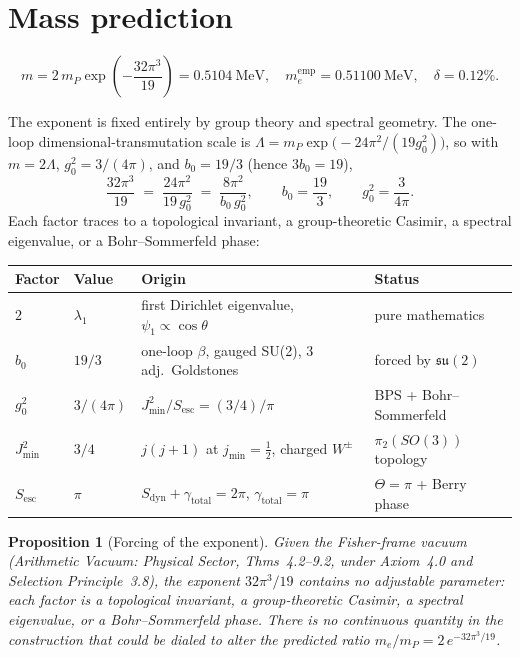 \documentclass[12pt]{article}
\newtheorem{proposition}[theorem]{Proposition}
\theoremstyle{definition}
\theoremstyle{remark}
\begin{document}
\section{Mass prediction}
\label{sec:mass}

\begin{equation}
\boxed{m=2\,m_P\exp\!\left(-\frac{32\pi^3}{19}\right)
=0.5104\ \mathrm{MeV},\quad m_e^{\mathrm{emp}}=0.51100\ \mathrm{MeV},
\quad \delta=0.12\%.}
\label{eq:massfinal}
\end{equation}

\medskip
The exponent is fixed entirely by group theory and spectral geometry. The
one-loop dimensional-transmutation scale is
$\Lambda=m_P\exp\!\bigl(-24\pi^2/(19g_0^2)\bigr)$, so with $m=2\Lambda$,
$g_0^2=3/(4\pi)$, and $b_0=19/3$ (hence $3b_0=19$),
\begin{equation}
\frac{32\pi^3}{19}\;=\;\frac{24\pi^2}{19\,g_0^2}\;=\;\frac{8\pi^2}{b_0\,g_0^2},
\qquad b_0=\frac{19}{3},\qquad g_0^2=\frac{3}{4\pi}.
\label{eq:expforced}
\end{equation}
Each factor traces to a topological invariant, a group-theoretic Casimir, a
spectral eigenvalue, or a Bohr--Sommerfeld phase:

\medskip
\begin{center}
{\small
\begin{tabular}{llll}\toprule
Factor & Value & Origin & Status\\\midrule
$2$ & $\lambda_1$ & first Dirichlet eigenvalue, $\psi_1\propto\cos\theta$ & pure mathematics\\
$b_0$ & $19/3$ & one-loop $\beta$, gauged SU(2), 3 adj.\ Goldstones & forced by $\mathfrak{su}(2)$\\
$g_0^2$ & $3/(4\pi)$ & $J_{\min}^2/S_{\mathrm{esc}}=(3/4)/\pi$ & BPS + Bohr--Sommerfeld\\
$J_{\min}^2$ & $3/4$ & $j(j{+}1)$ at $j_{\min}=\tfrac12$, charged $W^\pm$ & $\pi_2(SO(3))$ topology\\
$S_{\mathrm{esc}}$ & $\pi$ & $S_{\mathrm{dyn}}+\gamma_{\mathrm{total}}=2\pi$, $\gamma_{\mathrm{total}}=\pi$ & $\Theta=\pi$ + Berry phase\\\bottomrule
\end{tabular}}
\end{center}

\begin{proposition}[Forcing of the exponent]
\label{prop:expforced}
Given the Fisher-frame vacuum (\emph{Arithmetic Vacuum: Physical Sector},
Thms~4.2--9.2, under Axiom~4.0 and Selection Principle~3.8), the exponent
$32\pi^3/19$ contains no adjustable parameter: each factor is a topological
invariant, a group-theoretic Casimir, a spectral eigenvalue, or a
Bohr--Sommerfeld phase. There is no continuous quantity in the construction
that could be dialed to alter the predicted ratio $m_e/m_P=2\,e^{-32\pi^3/19}$.
\end{proposition}
\end{document}
